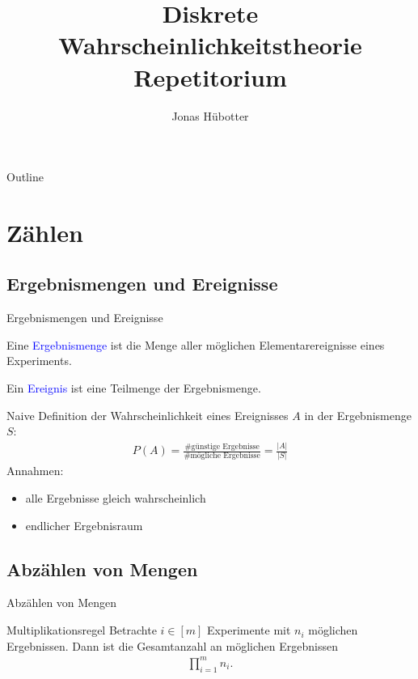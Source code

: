 \documentclass{beamer}
\title[DWT Repetitorium]{Diskrete Wahrscheinlichkeitstheorie \\ Repetitorium}
\author{Jonas Hübotter}
\date{}
\def\padding{\vspace{0.5cm}}
\def\b{\textcolor{blue}}
\begin{document}
\begin{frame}
  \titlepage
\end{frame}

\begin{frame}{Outline}
 \tableofcontents[subsectionstyle=hide, subsubsectionstyle=hide]
\end{frame}

\section{Zählen}

\subsection{Ergebnismengen und Ereignisse}
\begin{frame}{Ergebnismengen und Ereignisse}
    \begin{definition}
        Eine \b{Ergebnismenge} ist die Menge aller möglichen Elementarereignisse eines Experiments.
    \end{definition}\pause
    \begin{definition}
        Ein \b{Ereignis} ist eine Teilmenge der Ergebnismenge.
    \end{definition}\pause\padding
    Naive Definition der Wahrscheinlichkeit eines Ereignisses $A$ in der Ergebnismenge $S$:\pause
    \begin{align*}
        P(A) = \frac{\text{\# günstige Ergebnisse}}{\text{\# mögliche Ergebnisse}} = \frac{|A|}{|S|}
    \end{align*}\pause
    Annahmen:\pause
    \begin{itemize}
        \item alle Ergebnisse gleich wahrscheinlich\pause
        \item endlicher Ergebnisraum
    \end{itemize}
\end{frame}

\subsection{Abzählen von Mengen}
\begin{frame}{Abzählen von Mengen}
    \begin{block}{Multiplikationsregel}
        Betrachte $i \in [m]$ Experimente mit $n_i$ möglichen Ergebnissen. Dann ist die Gesamtanzahl an möglichen Ergebnissen
        \begin{align*}
            \prod_{i=1}^m n_i.
        \end{align*}
    \end{block}
\end{frame}
\end{document}
